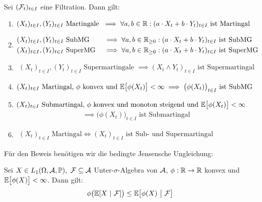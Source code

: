 \begin{proposition}\label{Prop2.1}\enter
	Sei $(\mathcal{F}_t)_{t\in I}$ eine Filtration. Dann gilt:
	\begin{enumerate}[label=\alph*)]
		\item $\begin{aligned}
			(X_t)_{t\in I},(Y_t)_{t\in I}\text{ Martingale }
			\implies\forall a,b\in\mathbb{R}: (a\cdot X_t+b\cdot Y_t)_{t\in I}\text{ ist Martingal}
		\end{aligned}$
		\item $\begin{aligned}
			&(X_t)_{t\in I},(Y_t)_{t\in I}\text{ SubMG}&
			&\implies\forall a,b\in\mathbb{R}_{\geq0}: (a\cdot X_t+b\cdot Y_t)_{t\in I}\text{ ist SubMG}\\
			&(X_t)_{t\in I},(Y_t)_{t\in I}\text{ SuperMG}&
			&\implies\forall a,b\in\mathbb{R}_{\geq0}: (a\cdot X_t+b\cdot Y_t)_{t\in I}\text{ ist SuperMG}
		\end{aligned}$
		\item $\begin{aligned}
			(X_t)_{t\in I},(Y_t)_{t\in I}\text{ Supermartingale }
			\implies (X_t\wedge Y_t)_{t\in I}\text{ ist Supermartingal}
		\end{aligned}$
		\item $\begin{aligned}
			(X_t)_{t\in I}\text{ Martingal, $\phi$ konvex und }\mathbb{E}\big[\phi(X_t)\big]<\infty
			\implies \big(\phi(X_t)\big)_{t\in I}\text{ ist SubMG}
		\end{aligned}$
		\item $\begin{aligned}
			(X_t)_{t\in I}\text{ Submartingal, $\phi$ konvex und monoton steigend und }\mathbb{E}\big[\phi(X_t)\big]<\infty
		\end{aligned}$
		\begin{align*}
			\implies \big(\phi(X_t)\big)_{t\in I}\text{ ist Submartingal}
		\end{align*}
		\item $\begin{aligned}
			(X_t)_{t\in I}\text{ Martingal}
			\Longleftrightarrow
			(X_t)_{t\in I}\text{ ist Sub- und Supermartingal}
		\end{aligned}$
	\end{enumerate}
\end{proposition}

Für den Beweis benötigen wir die bedingte Jensensche Ungleichung:

\begin{lemma}\label{lemma2.2BedingteJensenscheUngleichung}\enter
	Sei $X\in L_1(\Omega,\mathcal{A},\mathbb{P}),~\mathcal{F}\subseteq\mathcal{A}$ Unter-$\sigma$-Algebra von $\mathcal{A}$, $\phi:\mathbb{R}\to\mathbb{R}$ konvex und\\ $\mathbb{E}\big[\phi(X)\big]<\infty$. Dann gilt:
	\begin{align*}
		\phi\big(\mathbb{E}[X~|~\mathcal{F}]\big)\leq\mathbb{E}\big[\phi(X)~\big|~\mathcal{F}\big]
	\end{align*}
\end{lemma}

